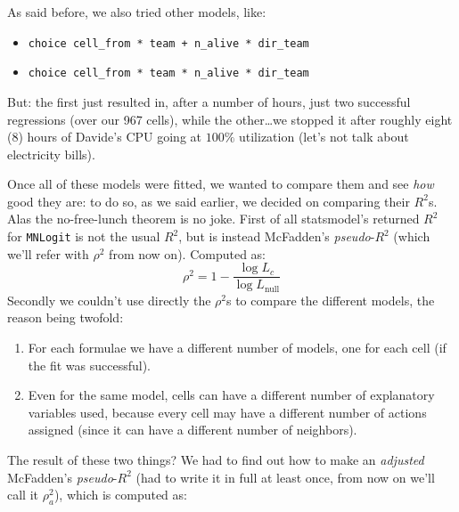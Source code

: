 \documentclass[9pt, a4paper]{IEEEtran}
\begin{document}
    As said before, we also tried other models, like:

    \begin{itemize}
        \item \texttt{choice \raisebox{-0.7ex}{\textasciitilde} cell\_from * team + n\_alive * dir\_team}
        \item \texttt{choice \raisebox{-0.7ex}{\textasciitilde} cell\_from * team * n\_alive * dir\_team}
    \end{itemize}

    But: the first just resulted in, after a number of hours, just two successful regressions (over our 967 cells), while the other\dots we stopped it after roughly eight ($8$) hours of Davide's CPU going at $100\%$ utilization (let's not talk about electricity bills).

    Once all of these models were fitted, we wanted to compare them and see \emph{how} good they are: to do so, as we said earlier, we decided on comparing their $R^2$s. Alas the no-free-lunch theorem is no joke. First of all statsmodel's returned $R^2$ for \texttt{MNLogit} is not the usual $R^2$, but is instead McFadden's \emph{pseudo}-$R^2$ (which we'll refer with $\rho^2$ from now on). Computed as:
    \begin{equation*}
        \rho^2 = 1 - \frac{\log L_c}{\log L_\mathrm{null}}
    \end{equation*}
    Secondly we couldn't use directly the $\rho^2$s to compare the different models, the reason being twofold:

    \begin{enumerate}
        \item For each formulae we have a different number of models, one for each cell (if the fit was successful).
        \item Even for the same model, cells can have a different number of explanatory variables used, because every cell may have a different number of actions assigned (since it can have a different number of neighbors).
    \end{enumerate}
    The result of these two things? We had to find out how to make an \emph{adjusted} McFadden's \emph{pseudo}-$R^2$ (had to write it in full at least once, from now on we'll call it $\rho^2_a$), which is computed as:
\end{document}
